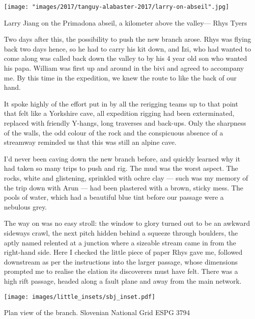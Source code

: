 \begin{marginfigure} \centering
\texttt{[image: "images/2017/tanguy-alabaster-2017/larry-on-abseil".jpg]}
\caption{Larry Jiang on the Primadona abseil, a kilometer above the \protect{} valley--- Rhys Tyers}
\end{marginfigure}

Two days after this, the possibility to push the new branch arose.  Rhys was flying back two days hence, so he had to carry his kit down, and Izi, who had wanted to come along was called back down the valley to  by his 4 year old son who wanted his papa. William was first up and around in the bivi and agreed to accompany me. By this time in the expedition, we knew the route to  like the back of our hand. 

It spoke highly of the effort put in by all the rerigging teams up to that point that  felt like a Yorkshire cave, all expedition rigging had been exterminated, replaced with friendly Y-hangs, long traverses and back-ups.  Only the sharpness of the walls, the odd colour of the rock and the conspicuous absence of a streamway reminded us that this was still an alpine cave.

I’d never been caving  down the new branch before, and quickly learned why it had taken so many trips to push and rig. The mud was the worst aspect. The rocks, white and glistening, sprinkled with ochre clay --- such was my memory of the trip down  with Arun --- had been plastered with a brown, sticky mess. The pools of water, which had a beautiful blue tint before our passage were a nebulous grey.  

The way on was no easy stroll: the window to glory turned out to be an awkward sideways crawl,  the next pitch hidden behind a squeeze through boulders, the aptly named  relented at a junction where a sizeable stream came in from the right-hand side. Here I checked the little piece of paper Rhys gave me, followed downstream as per the instructions into the larger  passage, whose dimensions prompted me to realise the elation its discoverers must have felt. There was a high rift passage, headed along a fault plane and away from the main  network.

\begin{marginfigure}
	\checkoddpage \ifoddpage \forcerectofloat \else \forceversofloat \fi
	\centering
	\texttt{[image: images/little\_insets/sbj\_inset.pdf]}
	\caption{Plan view of the \protect{} branch. Slovenian National Grid ESPG 3794}
	\label{Sweet baby Jesus inset}
\end{marginfigure}

